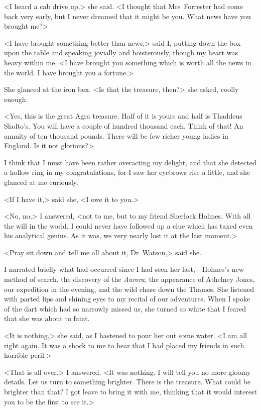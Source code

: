 <I heard a cab drive up,> she said. <I thought that Mrs~Forrester had come back very early, but I never dreamed that it might be you. What news have you brought me?>

<I have brought something better than news,> said I, putting down the box upon the table and speaking jovially and boisterously, though my heart was heavy within me. <I have brought you something which is worth all the news in the world. I have brought you a fortune.>

She glanced at the iron box. <Is that the treasure, then?> she asked, coolly enough.

<Yes, this is the great Agra treasure. Half of it is yours and half is Thaddeus Sholto's. You will have a couple of hundred thousand each. Think of that! An annuity of ten thousand pounds. There will be few richer young ladies in England. Is it not glorious?>

I think that I must have been rather overacting my delight, and that she detected a hollow ring in my congratulations, for I saw her eyebrows rise a little, and she glanced at me curiously.

<If I have it,> said she, <I owe it to you.>

<No, no,> I answered, <not to me, but to my friend Sherlock Holmes. With all the will in the world, I could never have followed up a clue which has taxed even his analytical genius. As it was, we very nearly lost it at the last moment.>

<Pray sit down and tell me all about it, Dr~Watson,> said she.

I narrated briefly what had occurred since I had seen her last,—Holmes's new method of search, the discovery of the \textit{Aurora}, the appearance of Athelney Jones, our expedition in the evening, and the wild chase down the Thames. She listened with parted lips and shining eyes to my recital of our adventures. When I spoke of the dart which had so narrowly missed us, she turned so white that I feared that she was about to faint.

<It is nothing,> she said, as I hastened to pour her out some water. <I am all right again. It was a shock to me to hear that I had placed my friends in such horrible peril.>

<That is all over,> I answered. <It was nothing. I will tell you no more gloomy details. Let us turn to something brighter. There is the treasure. What could be brighter than that? I got leave to bring it with me, thinking that it would interest you to be the first to see it.>

